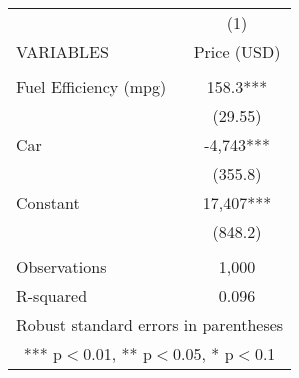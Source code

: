 \begin{tabular}{lc} \hline
 & (1) \\
VARIABLES & Price (USD) \\ \hline
 &  \\
Fuel Efficiency (mpg) & 158.3*** \\
 & (29.55) \\
Car & -4,743*** \\
 & (355.8) \\
Constant & 17,407*** \\
 & (848.2) \\
 &  \\
Observations & 1,000 \\
 R-squared & 0.096 \\ \hline
\multicolumn{2}{c}{ Robust standard errors in parentheses} \\
\multicolumn{2}{c}{ *** p$<$0.01, ** p$<$0.05, * p$<$0.1} \\
\end{tabular}

